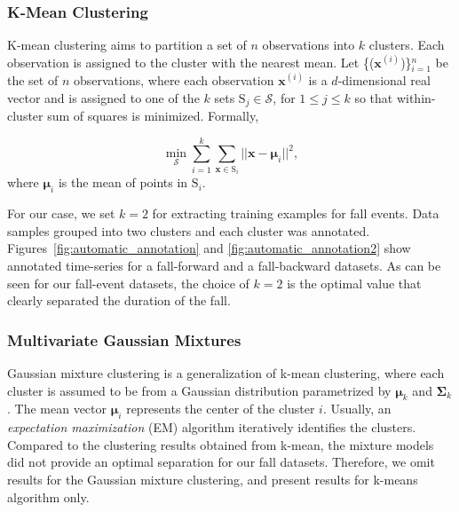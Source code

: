 \documentclass[]{IEEEtran}
\begin{document}
\subsubsection{K-Mean Clustering\cite{Bishop:2006:PRM:1162264}}
K-mean clustering aims to partition a set of $n$ observations into $k$ clusters. Each 
observation is assigned to the cluster with the nearest mean. Let 
\{($\mathbf{x}^{(i)}$)\}$_{i=1}^n$  be the set of $n$ 
observations, where each observation $\mathbf{x}^{(i)}$ is a $d$-dimensional real vector 
and is 
assigned to one of the $k$ sets $\mathrm{S}_j \in \mathcal{S}$, for $ 1 \leq  j \leq k$ so 
that 
within-cluster 
sum of squares is minimized. Formally,

$$ \min _{\mathcal{S}} \sum_{i=1}^{k} \sum_{\mathbf{x} \in \mathrm{S}_i} || \mathbf{x} - 
\boldsymbol{\mu}_i 
||^2,$$
where $\boldsymbol{\mu}_i $ is the mean of points in $\mathrm{S}_i$.

For our case, we set $k = 2$ for extracting  training examples for fall events. Data samples grouped into two
clusters and  each cluster was annotated. Figures~\ref{fig:automatic_annotation} and 
\ref{fig:automatic_annotation2}  show annotated time-series for a fall-forward and a fall-backward datasets. As can be seen for our fall-event datasets, the choice of $k=2$ is the 
optimal value that clearly separated the duration of the fall. 


\subsubsection{Multivariate Gaussian Mixtures}

Gaussian mixture clustering is a generalization of k-mean clustering, where each cluster 
is assumed to be from a Gaussian distribution parametrized by $\boldsymbol{\mu}_k$ and 
$\boldsymbol{\Sigma}_k$. The mean vector $\boldsymbol{\mu}_i$ represents the center of the 
cluster $i$. 
Usually, an \emph{expectation maximization} (EM) algorithm iteratively identifies the 
clusters. Compared to the clustering results obtained from k-mean, the mixture models did not 
provide an optimal separation for our fall datasets. Therefore, we omit results for the Gaussian mixture clustering, and present results for
k-means algorithm only. 
 

\end{document}
